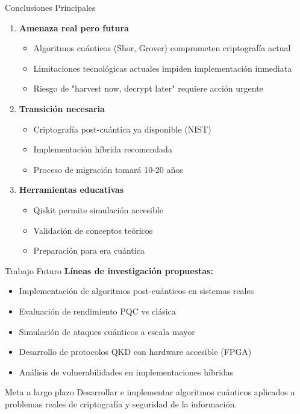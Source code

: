 \documentclass[aspectratio=169]{beamer}
\begin{document}
\begin{frame}{Conclusiones Principales}
\begin{enumerate}
\item \textbf{Amenaza real pero futura}
\begin{itemize}
\item Algoritmos cuánticos (Shor, Grover) comprometen criptografía actual
\item Limitaciones tecnológicas actuales impiden implementación inmediata
\item Riesgo de "harvest now, decrypt later" requiere acción urgente
\end{itemize}

\vspace{0.3cm}
\item \textbf{Transición necesaria}
\begin{itemize}
\item Criptografía post-cuántica ya disponible (NIST)
\item Implementación híbrida recomendada
\item Proceso de migración tomará 10-20 años
\end{itemize}

\vspace{0.3cm}
\item \textbf{Herramientas educativas}
\begin{itemize}
\item Qiskit permite simulación accesible
\item Validación de conceptos teóricos
\item Preparación para era cuántica
\end{itemize}
\end{enumerate}
\end{frame}

\begin{frame}{Trabajo Futuro}
\textbf{Líneas de investigación propuestas:}
\begin{itemize}
\item Implementación de algoritmos post-cuánticos en sistemas reales
\item Evaluación de rendimiento PQC vs clásica
\item Simulación de ataques cuánticos a escala mayor
\item Desarrollo de protocolos QKD con hardware accesible (FPGA)
\item Análisis de vulnerabilidades en implementaciones híbridas
\end{itemize}

\vspace{0.5cm}
\begin{block}{Meta a largo plazo}
Desarrollar e implementar algoritmos cuánticos aplicados a problemas reales de criptografía y seguridad de la información.
\end{block}
\end{frame}
\end{document}
